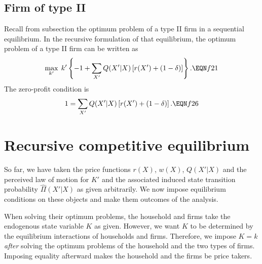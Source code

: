\subsection{Firm of type II}
Recall from subsection  the optimum problem
of a type II firm in a sequential equilibrium. In the recursive
formulation of that equilibrium, the optimum problem of a type II
firm can be written as
$$ \max_{k'}   \; k' \left\{ -1 + \sum_{X'} Q(X'|X) \left[r(X') + (1-\delta)
                           \right]\right\} .    \EQN f21  $$
The zero-profit condition is
$$ 1 = \sum_{X'} Q(X'|X) \left[r(X') +  (1-\delta) \right]. \EQN f26 $$








\section{Recursive competitive equilibrium}
So far, we have taken the price functions
$r(X)$, $w(X)$, $Q(X'|X)$ and the perceived law of motion  for $K'$
and the associated induced  state transition probability $\hat \Pi(X'|X)$
as given arbitrarily. We now
impose equilibrium conditions on these objects and make
them outcomes of the analysis.


When solving their optimum problems, the household and firms take
the endogenous state variable $K$ as given.  However, we want $K$
to be determined by the equilibrium interactions of households
and firms.  Therefore, we impose $K=k$ {\it after\/} solving the
optimum problems of the household and the two types of firms.
Imposing equality afterward makes the household and the firms
be price takers.


